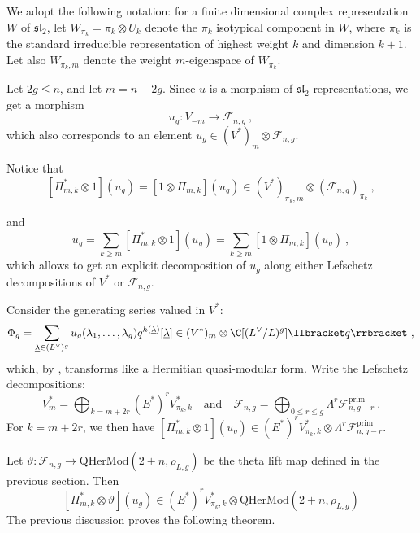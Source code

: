 \documentclass[11pt,letterpaper,english]{amsart}
\numberwithin{equation}{subsection}
\numberwithin{equation}{section}
\newcommand\cF{{\mathcal F}}
\newcommand{\QHerm}{\mathrm{QHerMod}}
\theoremstyle{plain}
\theoremstyle{remark}
\begin{document}
We adopt the following notation: for a finite dimensional complex representation $W$ of $\mathfrak{sl}_2$, let $W_{\pi_k}=\pi_k\otimes U_k$ denote the $\pi_k$ isotypical component in $W$, where $\pi_k$ is the standard irreducible representation of highest weight $k$ and dimension $k+1$. Let also $W_{\pi_k,m}$ denote the weight $m$-eigenspace  of $W_{\pi_k}$. 

Let $2g\leq n$, and let $m=n-2g$. Since $u$ is a morphism of $\mathfrak{sl}_2$-representations, we get a morphism \[u_g:V_{-m}\rightarrow \cF_{n,g}~,\] which also corresponds to an element $u_g\in (V^*)_{m}\otimes \cF_{n,g}$.

Notice that \[\left[\Pi_{m,k}^*\otimes 1\right](u_g)=\left[1\otimes \Pi_{m,k}\right](u_g)\in (V^*)_{\pi_k,m}\otimes (\cF_{n,g})_{\pi_k}~,\]

and \[u_g=\sum_{k\geq m}[\Pi^*_{m,k}\otimes 1](u_g)=\sum_{k\geq m}[1\otimes \Pi_{m,k}](u_g)~,\] 
which allows to get an explicit decomposition of $u_g$ along either Lefschetz decompositions of $V^*$ or $\cF_{n,g}$.



Consider the generating series valued in $V^*$:
\[\Phi_{g}=\sum_{\underline{\lambda}\in (L^\vee)^g}u_g(\lambda_1,\ldots,\lambda_g)q^{h(\underline \lambda)}{[\underline{\lambda}]}\in (V^{*})_m\otimes\C[(L^{\vee}/L)^g]\llbracket q \rrbracket ~,\]
which, by , transforms like a Hermitian quasi-modular form. Write the Lefschetz decompositions: 
\[V^{*}_{m}=\bigoplus_{k=m+2r} (E^*)^rV^{*}_{\pi_k,k}\quad \textrm{and}\quad  \cF_{n,g}=\bigoplus _{0\leq r\leq g}\Lambda^r\cF_{n,g-r}^{\mathrm{prim}}~.\] 
For $k=m+2r$, we then have $ \left[\Pi_{m,k}^*\otimes 1\right](u_g)\in  (E^*)^rV^{*}_{\pi_k,k}\otimes  \Lambda^r\cF_{n,g-r}^{\mathrm{prim}}$.
\medskip 

Let $\vartheta: \cF_{n,g}\rightarrow \QHerm(2+n,\rho_{L,g})$ be the theta lift map defined in the previous section. Then
\[\left[\Pi_{m,k}^*\otimes \vartheta\right](u_g)\in  (E^*)^rV^{*}_{\pi_k,k}\otimes  \QHerm(2+n,\rho_{L,g})\]
The previous discussion proves the following theorem.
\end{document}
